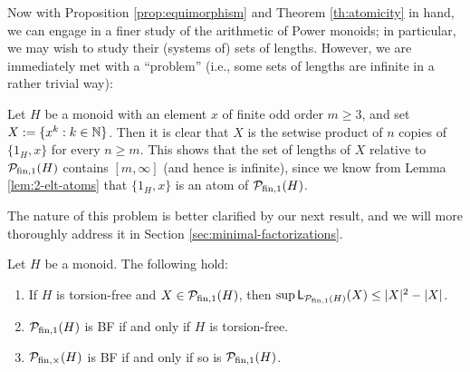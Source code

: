 Now with Proposition \ref{prop:equimorphism} and Theorem \ref{th:atomicity} in hand, we can engage in a finer study of the arithmetic of Power monoids; in particular, we may wish to study their (systems of) sets of lengths. However, we are immediately met with a ``problem'' (i.e., some sets of lengths are infinite in a rather trivial way):
%
\begin{eg}\label{unbounded-fzn}
	Let $H$ be a monoid with an element $x$ of finite odd order $m \ge 3$, and set $X := \{x^k : k \in \mathbb{N} \}$. Then it is clear that $X$ is the setwise product of $n$ copies of $\{1_H, x\}$ for every $n \ge m$. This shows that the set of lengths of $X$ relative to $\mathcal{P}_{\textrm{fin}, 1}(H)$ contains $[ m, \infty ]$ (and hence is infinite), since we know from Lemma \ref{lem:2-elt-atoms} that $\{1_H, x\}$ is an atom of $\mathcal{P}_{\textrm{fin}, 1}(H)$.
\end{eg}
%
The nature of this problem is better clarified by our next result, and we will more thoroughly address it in Section \ref{sec:minimal-factorizations}.
%
\begin{thm}\label{thm:BF-torsion}
Let $H$ be a monoid. The following hold:
\begin{enumerate}[label={\rm (\roman{*})}]
\item\label{it:thm:BF-torsion(i)} If $H$ is torsion-free and $X\in \mathcal{P}_{\textrm{fin}, 1}(H)$, then $\sup \mathsf{L}_{\mathcal P_{\textrm{fin}, 1}(H)}(X) \le |X|^2-|X|$.
\item\label{it:thm:BF-torsion(ii)} $\mathcal{P}_{\textrm{fin}, 1}(H)$ is \textup{BF} if and only if $H$ is torsion-free.
\item\label{it:thm:BF-torsion(iii)} $\mathcal{P}_{\textrm{fin}, \times}(H)$ is \textup{BF} if and only if so is $\mathcal P_{\textrm{fin}, 1}(H)$.
\end{enumerate}
\end{thm}


